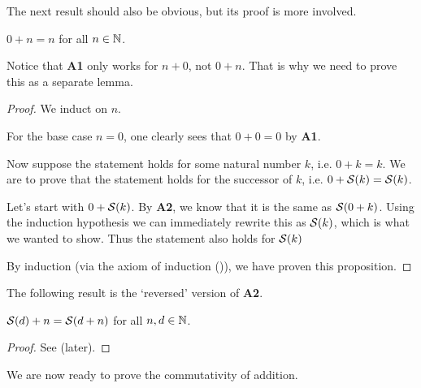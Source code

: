 The next result should also be obvious, but its proof is more involved.
\begin{lemma}\label{lemma:sum-of-0-and-n}
    $0 + n = n$ for all $n \in \mathbb{N}$.
\end{lemma}
Notice that \textbf{A1} only works for $n + 0$, not $0 + n$. That is why we need to prove this as a separate lemma.
\begin{proof}
    We induct on $n$.

    For the base case $n = 0$, one clearly sees that $0 + 0 = 0$ by \textbf{A1}.

    Now suppose the statement holds for some natural number $k$, i.e. $0 + k = k$. We are to prove that the statement holds for the successor of $k$, i.e. $0 + {\mathcal{S}(k)} = {\mathcal{S}(k)}$.

    Let's start with $0 + {\mathcal{S}(k)}$. By \textbf{A2}, we know that it is the same as ${\mathcal{S}(0 + k)}$. Using the induction hypothesis we can immediately rewrite this as ${\mathcal{S}(k)}$, which is what we wanted to show. Thus the statement also holds for ${\mathcal{S}(k)}$

    By induction (via the axiom of induction ()), we have proven this proposition.
\end{proof}

The following result is the `reversed' version of \textbf{A2}.

\begin{lemma}\label{lemma:sum-of-successor-and-n}
    ${\mathcal{S}(d)} + n = {\mathcal{S}(d + n)}$ for all $n, d \in \mathbb{N}$.
\end{lemma}
\begin{proof}
    See  (later).
\end{proof}

We are now ready to prove the commutativity of addition.

